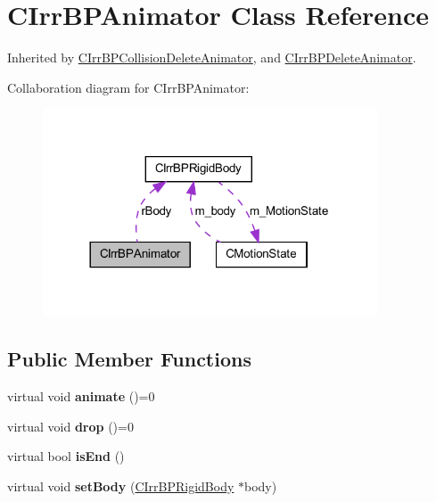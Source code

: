 \hypertarget{class_c_irr_b_p_animator}{
\section{CIrrBPAnimator Class Reference}
\label{class_c_irr_b_p_animator}
}


Inherited by \hyperlink{class_c_irr_b_p_collision_delete_animator}{CIrrBPCollisionDeleteAnimator}, and \hyperlink{class_c_irr_b_p_delete_animator}{CIrrBPDeleteAnimator}.



Collaboration diagram for CIrrBPAnimator:\nopagebreak
\begin{figure}[H]
\begin{center}
\leavevmode
\includegraphics[width=281pt]{class_c_irr_b_p_animator__coll__graph}
\end{center}
\end{figure}
\subsection*{Public Member Functions}
\begin{DoxyCompactItemize}
\item 
\hypertarget{class_c_irr_b_p_animator_ac0c9f71966eb1f8a63138963a5a206d8}{
virtual void {\bfseries animate} ()=0}
\label{class_c_irr_b_p_animator_ac0c9f71966eb1f8a63138963a5a206d8}

\item 
\hypertarget{class_c_irr_b_p_animator_a9de50a01d583d29d8cd43a78f5b03050}{
virtual void {\bfseries drop} ()=0}
\label{class_c_irr_b_p_animator_a9de50a01d583d29d8cd43a78f5b03050}

\item 
\hypertarget{class_c_irr_b_p_animator_a2377f4311835330ee840d71f6f0989ea}{
virtual bool {\bfseries isEnd} ()}
\label{class_c_irr_b_p_animator_a2377f4311835330ee840d71f6f0989ea}

\item 
\hypertarget{class_c_irr_b_p_animator_ab9004ce54c3c92b3654ff236884e03f4}{
virtual void {\bfseries setBody} (\hyperlink{class_c_irr_b_p_rigid_body}{CIrrBPRigidBody} $\ast$body)}
\label{class_c_irr_b_p_animator_ab9004ce54c3c92b3654ff236884e03f4}

\end{DoxyCompactItemize}
